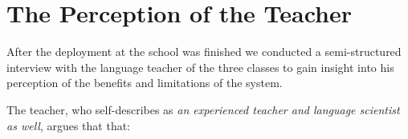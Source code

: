 
\newcommand{\q}[1]{($Q_#1$)}
\newcommand{\qq}[2]{($Q_#1,Q_{#2}$)}

\newpage
\section{The Perception of the Teacher}
After the deployment at the school was finished we conducted a semi-structured interview with the language teacher of the three classes to gain insight into his perception of the benefits and limitations of the system. 

The teacher, who self-describes as {\em an experienced teacher and language scientist as well}, argues that that: 

